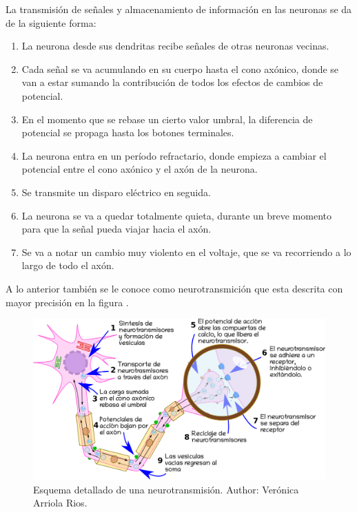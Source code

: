La transmisión de señales y almacenamiento de información en las neuronas se da de la siguiente forma:\parencite{neurona_A_cerebro}

\begin{enumerate}
 \item La neurona desde sus dendritas recibe señales de otras neuronas vecinas.
 \item Cada señal se va acumulando en su cuerpo hasta el cono axónico, donde se van a estar sumando la contribución de todos los efectos de cambios de potencial.
 \item En el momento que se rebase un cierto valor umbral, la diferencia de potencial se propaga hasta los botones terminales.
 \item La neurona entra en un período refractario, donde empieza a cambiar el potencial entre el cono axónico y el axón de la neurona.
 \item Se transmite un disparo eléctrico en seguida.
 \item La neurona se va a quedar totalmente quieta, durante un breve momento para que la señal pueda viajar hacia el axón.
 \item Se va a notar un cambio muy violento en el voltaje, que se va recorriendo a lo largo de todo el axón. 
\end{enumerate}

A lo anterior también se le conoce como neurotransmición que esta  descrita con mayor precisión en la figura  .

\begin{figure}[h]
 \centering
 \includegraphics[scale=0.2]{../Figuras/neurotransmision.png} 
 \caption{Esquema detallado de una neurotransmisión. Author: Verónica Arriola Rios.}
 \label{fig:nTransmision}
\end{figure}


